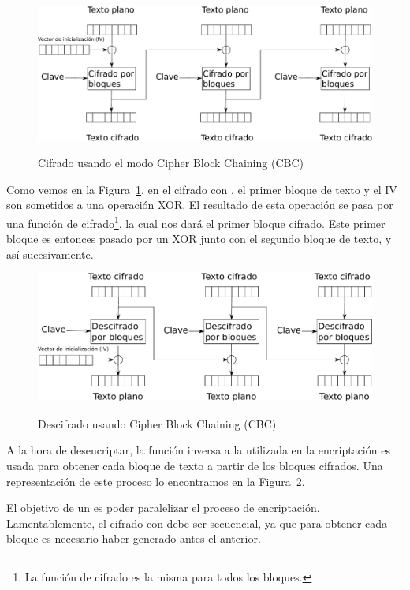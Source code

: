  \begin{figure}[ht]
   \centering
   \includegraphics[scale=0.4]{Figures/CBC_enc}
   \decoRule
   \caption[Cipher Block Chaining (CBC) - Cifrado]{Cifrado usando el modo Cipher Block Chaining (CBC)} \emph{\parencite{Reference1}}
   \label{fig:CBC_enc}
 \end{figure}

 Como vemos en la Figura~\ref{fig:CBC_enc}, en el cifrado con , el primer bloque de texto y el IV son sometidos a una operación XOR.
 El resultado de esta operación se pasa por una función de cifrado\footnote{La función de cifrado es la misma para todos los bloques.}, la cual nos dará el primer bloque cifrado.
 Este primer bloque es entonces pasado por un XOR junto con el segundo bloque de texto, y así sucesivamente.

 \begin{figure}[ht]
   \centering
   \includegraphics[scale=0.4]{Figures/CBC_dec}
   \decoRule
   \caption[Cipher Block Chaining (CBC) - Descifrado]{Descifrado usando Cipher Block Chaining (CBC)} \emph{\parencite{Reference2}}
   \label{fig:CBC_dec}
 \end{figure}

 A la hora de desencriptar, la función inversa a la utilizada en la encriptación
 es usada para obtener cada bloque de texto a partir de los bloques cifrados.
 Una representación de este proceso lo encontramos en la Figura~\ref{fig:CBC_dec}.

 El objetivo de un  es poder paralelizar el proceso de encriptación.
 Lamentablemente, el cifrado con  debe ser secuencial,
 ya que para obtener cada bloque es necesario haber generado antes el anterior.

